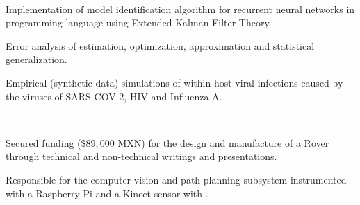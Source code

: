 \documentclass[]{deedy-resume-openfont}
\begin{document}
\begin{minipage}[t]{0.66\textwidth}
\\
\vspace{\topsep} %
\begin{tightemize}
\item Implementation of model identification algorithm for recurrent neural networks in  programming language using Extended Kalman Filter Theory.
\item Error analysis of estimation, optimization, approximation and statistical generalization. 
\item Empirical (synthetic data) simulations of within-host viral infections caused by the viruses of SARS-COV-2, HIV and Influenza-A.
\end{tightemize}
\sectionsep

\\
\vspace{\topsep} %
\begin{tightemize}
\item Secured funding ($\$89,000$ MXN) for the design and manufacture of a Rover through technical and non-technical writings and presentations.
\item Responsible for the computer vision and path planning subsystem instrumented with a Raspberry Pi and a Kinect sensor with . 
\end{tightemize}

\begin{comment}
\section{Extracurriculars} 
\begin{tabular}{rll}
2018/10 & (Winner) 
\end{tabular}

\end{comment}
\end{minipage}
\end{document}
